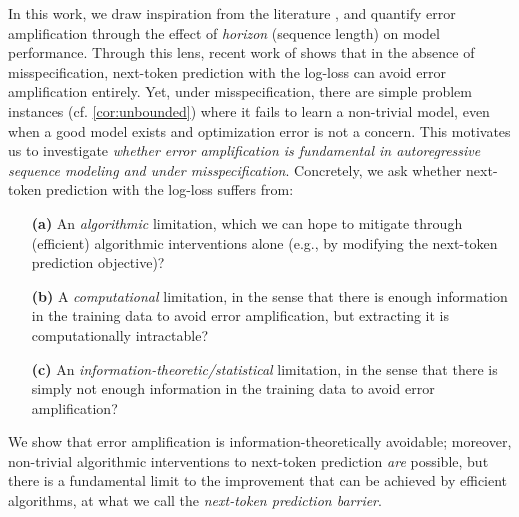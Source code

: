     In this work, we draw inspiration from the \IL{}
    literature \citep{ross2010efficient,rajaraman2020toward,rajaraman2021provably,block2024provable,foster2024behavior}, and
    quantify error amplification through the effect of
    \emph{horizon} (sequence length) on model performance. Through
    this lens, recent work of
\citet{foster2024behavior} shows that in the absence of
    misspecification, next-token prediction with the log-loss can avoid error
    amplification entirely. Yet, under misspecification, there are simple problem instances (cf. \cref{cor:unbounded}) where it %
    fails to learn a non-trivial model,
    even when a good model exists and optimization
    error is not a concern. %
    This motivates us to investigate \emph{whether error amplification is fundamental in autoregressive sequence modeling and \IL{} under misspecification}. Concretely, we ask whether next-token prediction with the log-loss suffers from:\loose
\begin{itemize}[noitemsep, topsep=0.25pt]%
      \item[\textbf{(a)}] An \emph{algorithmic} limitation, which we can hope to 
        mitigate through (efficient)
        algorithmic interventions alone (e.g., by modifying the
        next-token prediction objective)?%
      \item[\textbf{(b)}] A \emph{computational} limitation, in the sense that
        there is enough information in the training data to avoid error amplification, but extracting it is
        computationally intractable?%
      \item[\textbf{(c)}] An \emph{information-theoretic/statistical} limitation, in the
      sense that there is simply not enough information in the
      training data to
      avoid error amplification?%
      \loose
    \end{itemize}
We show that error amplification is information-theoretically
avoidable; moreover, non-trivial algorithmic interventions to
next-token prediction \emph{are} possible, but there is a fundamental
limit to the improvement that can be achieved by efficient algorithms, at what we call the \emph{next-token prediction barrier}.







    









%


